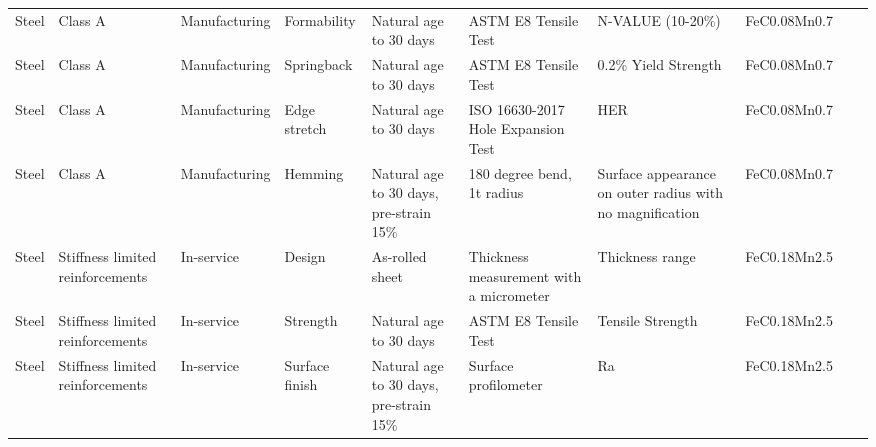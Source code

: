\begin{table}[!htbp]
\begin{threeparttable}
{\begin{tabular}{@{}p{1.5cm} p{2.4cm} p{2cm} p{2.5cm} p{4cm} p{3.5cm} p{3.8cm} p{3.2cm} p{2.7cm} p{2.7cm}@{}}
{Steel}    & {Class A}                          & {Manufacturing} & {Formability}     & {Natural age to 30 days}                                              & {ASTM E8 Tensile Test}                    & {N-VALUE (10-20\%)}                                        & {FeC0.08Mn0.7}                & {}             & {}                   \\
{Steel}    & {Class A}                          & {Manufacturing} & {Springback}      & {Natural age to 30 days}                                              & {ASTM E8 Tensile Test}                    & {0.2\% Yield Strength}                                     & {FeC0.08Mn0.7}                & {}             & {}                   \\
{Steel}    & {Class A}                          & {Manufacturing} & {Edge stretch}    & {Natural age to 30 days}                                              & {ISO 16630-2017 Hole Expansion Test}      & {HER}                                                      & {FeC0.08Mn0.7}                & {}             & {}                   \\
{Steel}    & {Class A}                          & {Manufacturing} & {Hemming}         & {Natural age to 30 days, pre-strain 15\%}                             & {180 degree bend, 1t radius}              & {Surface appearance on outer radius with no magnification} & {FeC0.08Mn0.7}                & {}             & {}                   \\ \hline
{Steel}    & {Stiffness limited reinforcements} & {In-service}    & {Design}          & {As-rolled sheet}                                                     & {Thickness measurement with a micrometer} & {Thickness range}                                          & {FeC0.18Mn2.5}                & {}             & {}                   \\
{Steel}    & {Stiffness limited reinforcements} & {In-service}    & {Strength}        & {Natural age to 30 days}                                              & {ASTM E8 Tensile Test}                    & {Tensile Strength}                                         & {FeC0.18Mn2.5}                & {}             & {}                   \\
{Steel}    & {Stiffness limited reinforcements} & {In-service}    & {Surface finish}  & {Natural age to 30 days, pre-strain 15\%}                             & {Surface profilometer}                    & {Ra}                                                       & {FeC0.18Mn2.5}                & {}             & {}                   \\

\end{tabular}}
\end{threeparttable}
\end{table}
